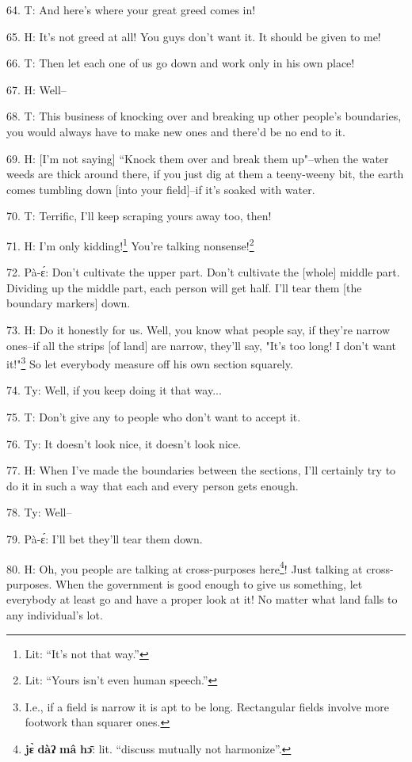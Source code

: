64. T: And here's where your great greed comes in!

65. H: It's not greed at all! You guys don't want it. It should be given to me!

66. T: Then let each one of us go down and work only in his own place!

67. H: Well--

68. T: This business of knocking over and breaking up other people's boundaries,
you would always have to make new ones and there'd be no end to it.

69. H: [I'm not saying] ``Knock them over and break them up"--when the
water weeds are thick around there, if you just dig at them a teeny-weeny bit,
the earth comes tumbling down [into your field]--if it's soaked with water.

70. T: Terrific, I'll keep scraping yours away too, then!

71. H:  I'm only kidding!\footnote{Lit: ``It's not that way.''} You're talking nonsense!\footnote{Lit: ``Yours isn't even human speech.''}

72. Pà-ɛ́: Don't cultivate the upper part. Don't cultivate the [whole] middle
part. Dividing up the middle part, each person will get half. I'll tear them [the
boundary markers] down.

73. H: Do it honestly for us. Well, you know what people say, if they're narrow
ones--if all the strips [of land] are narrow, they'll say, "It's too long!
I don't want it!"\footnote{I.e., if a field is narrow it is apt to be long. Rectangular fields involve more footwork than squarer ones.} So let everybody measure off his own section squarely.

74. Ty: Well, if you keep doing it that way...

75. T: Don't give any to people who don't want to accept it.

76. Ty: It doesn't look nice, it doesn't look nice.

77. H: When I've made the boundaries between the sections, I'll certainly try to
do it in such a way that each and every person gets enough.

78. Ty: Well--

79. Pà-ɛ́: I'll bet they'll tear them down.

80. H: Oh, you people are talking at cross-purposes here\footnote{\textbf{jɛ̀} \textbf{dàʔ} \textbf{mâ} \textbf{hɔ̄}: lit. ``discuss mutually not harmonize''.}! Just talking at cross-purposes.
When the government is good enough to give us something, let everybody at least
go and have a proper look at it! No matter what land falls to any individual's
lot.

